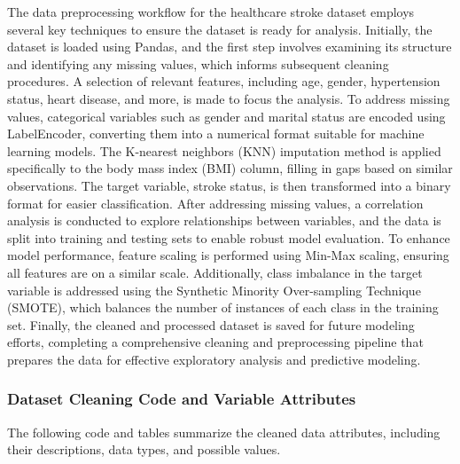 \documentclass[runningheads]{llncs}
\begin{document}
\begin{enumerate}
The data preprocessing workflow for the healthcare stroke dataset employs several key techniques to ensure the dataset is ready for analysis. Initially, the dataset is loaded using Pandas, and the first step involves examining its structure and identifying any missing values, which informs subsequent cleaning procedures. A selection of relevant features, including age, gender, hypertension status, heart disease, and more, is made to focus the analysis. To address missing values, categorical variables such as gender and marital status are encoded using LabelEncoder, converting them into a numerical format suitable for machine learning models. The K-nearest neighbors (KNN) imputation method is applied specifically to the body mass index (BMI) column, filling in gaps based on similar observations. The target variable, stroke status, is then transformed into a binary format for easier classification. After addressing missing values, a correlation analysis is conducted to explore relationships between variables, and the data is split into training and testing sets to enable robust model evaluation. To enhance model performance, feature scaling is performed using Min-Max scaling, ensuring all features are on a similar scale. Additionally, class imbalance in the target variable is addressed using the Synthetic Minority Over-sampling Technique (SMOTE), which balances the number of instances of each class in the training set. Finally, the cleaned and processed dataset is saved for future modeling efforts, completing a comprehensive cleaning and preprocessing pipeline that prepares the data for effective exploratory analysis and predictive modeling.

\subsubsection{Dataset Cleaning Code and Variable Attributes}

The following code and tables summarize the cleaned data attributes, including their descriptions, data types, and possible values.


\end{enumerate}
\end{document}
